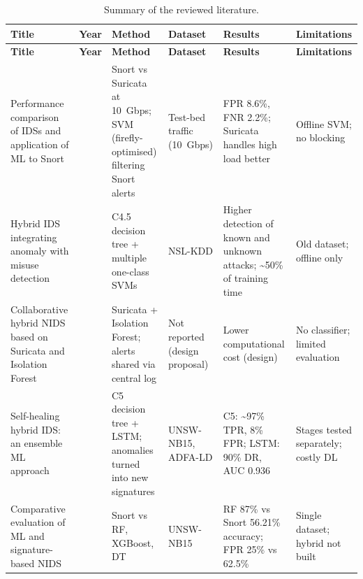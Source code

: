 {\footnotesize\setlength{\tabcolsep}{3.5pt}
\begin{longtable}{|>{\raggedright\arraybackslash}p{}|>{\raggedright\arraybackslash}p{}|>{\raggedright\arraybackslash}p{}|>{\raggedright\arraybackslash}p{}|>{\raggedright\arraybackslash}p{}|>{\raggedright\arraybackslash}p{}|}
\caption{Summary of the reviewed literature.}\label{tab:3.1}\\
\hline
\textbf{Title} & \textbf{Year} & \textbf{Method} & \textbf{Dataset} & \textbf{Results} & \textbf{Limitations} \\ \hline
\endfirsthead
\hline
\textbf{Title} & \textbf{Year} & \textbf{Method} & \textbf{Dataset} & \textbf{Results} & \textbf{Limitations} \\ \hline
\endhead
Performance comparison of IDSs and application of ML to Snort~\cite{lr:shah2018} & 2018 & Snort vs Suricata at 10~Gbps; SVM (firefly-optimised) filtering Snort alerts & Test-bed traffic (10~Gbps) & FPR 8.6\%, FNR 2.2\%; Suricata handles high load better & Offline SVM; no blocking \\ \hline
Hybrid IDS integrating anomaly with misuse detection~\cite{lr:kim2014} & 2014 & C4.5 decision tree + multiple one-class SVMs & NSL-KDD & Higher detection of known and unknown attacks; \textasciitilde50\% of training time & Old dataset; offline only \\ \hline
Collaborative hybrid NIDS based on Suricata and Isolation Forest~\cite{lr:chiba2019} & 2019 & Suricata + Isolation Forest; alerts shared via central log & Not reported (design proposal) & Lower computational cost (design) & No classifier; limited evaluation \\ \hline
Self-healing hybrid IDS: an ensemble ML approach~\cite{lr:kushal2024} & 2024 & C5 decision tree + LSTM; anomalies turned into new signatures & UNSW-NB15, ADFA-LD & C5: \textasciitilde97\% TPR, 8\% FPR; LSTM: 90\% DR, AUC 0.936 & Stages tested separately; costly DL \\ \hline
Comparative evaluation of ML and signature-based NIDS~\cite{lr:wenudeoji2025} & 2025 & Snort vs RF, XGBoost, DT & UNSW-NB15 & RF 87\% vs Snort 56.21\% accuracy; FPR 25\% vs 62.5\% & Single dataset; hybrid not built \\ \hline

\end{longtable}}
